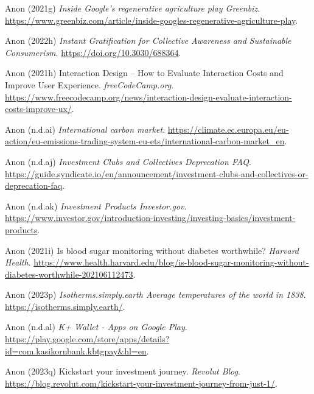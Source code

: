 \documentclass[
  letterpaper,
  DIV=11,
  numbers=noendperiod]{scrartcl}
\newlength{\cslhangindent}
\newenvironment{CSLReferences}[2] %
 {\begin{list}{}{%
  \setlength{\itemindent}{0pt}
  \setlength{\leftmargin}{0pt}
  \setlength{\parsep}{0pt}
  \ifodd #1
   \setlength{\leftmargin}{\cslhangindent}
   \setlength{\itemindent}{-1\cslhangindent}
  \fi
  \setlength{\itemsep}{#2\baselineskip}}}
 {\end{list}}
\begin{document}
\begin{CSLReferences}{0}{1}
Anon (2021g) \emph{Inside {Google}'s regenerative agriculture play
{\textbar} {Greenbiz}}.
\url{https://www.greenbiz.com/article/inside-googles-regenerative-agriculture-play}.

Anon (2022h) \emph{Instant {Gratification} for {Collective Awareness}
and {Sustainable Consumerism}}. \url{https://doi.org/10.3030/688364}.

Anon (2021h) Interaction {Design} -- {How} to {Evaluate Interaction
Costs} and {Improve User Experience}. \emph{freeCodeCamp.org}.
\url{https://www.freecodecamp.org/news/interaction-design-evaluate-interaction-costs-improve-ux/}.

Anon (n.d.ai) \emph{International carbon market}.
\url{https://climate.ec.europa.eu/eu-action/eu-emissions-trading-system-eu-ets/international-carbon-market_en}.

Anon (n.d.aj) \emph{Investment {Clubs} and {Collectives} {\textbar}
{Deprecation FAQ}}.
\url{https://guide.syndicate.io/en/announcement/investment-clubs-and-collectives-or-deprecation-faq}.

Anon (n.d.ak) \emph{Investment {Products} {\textbar} {Investor}.gov}.
\url{https://www.investor.gov/introduction-investing/investing-basics/investment-products}.

Anon (2021i) Is blood sugar monitoring without diabetes worthwhile?
\emph{Harvard Health}.
\url{https://www.health.harvard.edu/blog/is-blood-sugar-monitoring-without-diabetes-worthwhile-202106112473}.

Anon (2023p) \emph{Isotherms.simply.earth {\textbar} {Average}
temperatures of the world in 1838}.
\url{https://isotherms.simply.earth/}.

Anon (n.d.al) \emph{K+ {Wallet} - {Apps} on {Google Play}}.
\url{https://play.google.com/store/apps/details?id=com.kasikornbank.kbtgpay&hl=en}.

Anon (2023q) Kickstart your investment journey. \emph{Revolut Blog}.
\url{https://blog.revolut.com/kickstart-your-investment-journey-from-just-1/}.


\end{CSLReferences}
\end{document}
